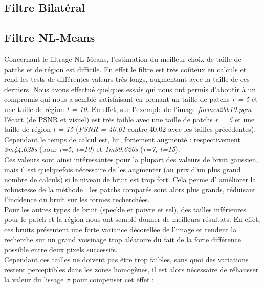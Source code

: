 \documentclass[a4,12pt]{article}
\begin{document}
\subsection{Filtre Bilatéral}

\subsection{Filtre NL-Means}
Concernant le filtrage NL-Means, l'estimation du meilleur choix de taille de patchs et de région est difficile. En effet le filtre est très coûteux en calculs et rend les tests de différentes valeurs très longs, augmentant avec la taille de ces derniers. Nous avons effectué quelques essais qui nous ont permis d'aboutir à un compromis qui nous a semblé satisfaisant en prenant un taille de patchs \textit{r = 5} et une taille de région \textit{t = 10}. En effet, sur l'exemple de l'image \textit{formes2bb10.pgm} l'écart (de PSNR et visuel) est très faible avec une taille de patchs \textit{r = 5} et une taille de région \textit{t = 15} (\textit{PSNR = 40.01} contre $40.02$ avec les tailles précédentes). Cependant le temps de calcul est, lui, fortement augmenté : respectivement \textit{3m44.028s} (pour \textit{r=5, t=10}) et \textit{1m39.620s} (\textit{r=7, t=15}).\\

Ces valeurs sont ainsi intéressantes pour la plupart des valeurs de bruit gaussien, mais il est quelquefois nécessaire de les augmenter (au prix d'un plus grand nombre de calculs) si le niveau de bruit est trop fort. Cela perme d' améliorer la robustesse de la méthode : les patchs comparés sont alors plus grands, réduisant l'incidence du bruit sur les formes recherchées.\\

Pour les autres types de bruit (speckle et poivre et sel), des tailles inférieures pour le patch et la région nous ont semblé donner de meilleurs résultats. En effet, ces bruits présentent une forte variance décorellée de l'image et rendent la recherche sur un grand voisinage trop aléatoire du fait de la forte différence possible entre deux pixels successifs.\\

Cependant ces tailles ne doivent pas être trop faibles, sans quoi des variations restent perceptibles dans les zones homogènes, il est alors nécessaire de réhausser la valeur du lissage $\sigma$ pour compenser cet effet :\\
\end{document}
